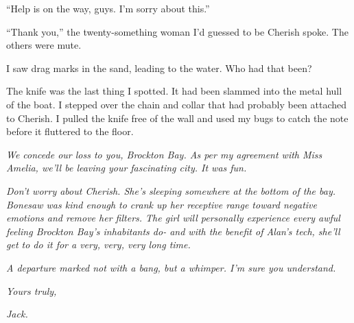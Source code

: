 ``Help is on the way, guys.  I'm sorry about this.''



``Thank you,'' the twenty-something woman I'd guessed to be Cherish spoke.  The others were mute.



I saw drag marks in the sand, leading to the water.  Who had that been?



The knife was the last thing I spotted.  It had been slammed into the metal hull of the boat.  I stepped over the chain and collar that had probably been attached to Cherish.  I pulled the knife free of the wall and used my bugs to catch the note before it fluttered to the floor.



\emph{We concede our loss to you, Brockton Bay.  As per my agreement with Miss Amelia, we'll be leaving your fascinating city.  It was fun.}



\emph{Don't worry about Cherish.  She's sleeping somewhere at the bottom of the bay.  Bonesaw was kind enough to crank up her receptive range toward negative emotions and remove her filters.  The girl will personally experience every awful feeling Brockton Bay's inhabitants do- and with the benefit of Alan's tech, she'll get to do it for a very, very, very long time.  }



\emph{A departure marked n}\emph{ot with a bang, but a whimper.  I'm sure you understand.}



\emph{Yours truly, }



\emph{Jack.}





